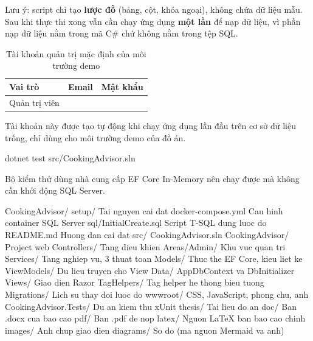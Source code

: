 Lưu ý: script chỉ tạo \textbf{lược đồ} (bảng, cột, khóa ngoại), không chứa dữ liệu
mẫu. Sau khi thực thi xong vẫn cần chạy ứng dụng \textbf{một lần} để
 nạp dữ liệu, vì phần nạp dữ liệu nằm trong mã C\# chứ không
nằm trong tệp SQL.


\begin{table}[H]
\centering
\caption{Tài khoản quản trị mặc định của môi trường demo}
\label{tab:tai-khoan}
\begin{tabularx}{\textwidth}{|P{3.4cm}|Y|Y|}
\hline
\bfseries Vai trò & \bfseries Email & \bfseries Mật khẩu \\ \hline
Quản trị viên &  &  \\ \hline
\end{tabularx}
\end{table}

Tài khoản này được tạo tự động khi chạy ứng dụng lần đầu trên cơ sở dữ liệu
trống, chỉ dùng cho môi trường demo của đồ án.


\begin{codeblock}
dotnet test src/CookingAdvisor.sln
\end{codeblock}

Bộ kiểm thử dùng nhà cung cấp EF Core In-Memory nên chạy được mà không cần khởi
động SQL Server.


\begin{codeblock}
CookingAdvisor/
  setup/                       Tai nguyen cai dat
    docker-compose.yml         Cau hinh container SQL Server
    sql/InitialCreate.sql      Script T-SQL dung luoc do
    README.md                  Huong dan cai dat
  src/
    CookingAdvisor.sln
    CookingAdvisor/            Project web
      Controllers/             Tang dieu khien
      Areas/Admin/             Khu vuc quan tri
      Services/                Tang nghiep vu, 3 thuat toan
      Models/                  Thuc the EF Core, kieu liet ke
      ViewModels/              Du lieu truyen cho View
      Data/                    AppDbContext va DbInitializer
      Views/                   Giao dien Razor
      TagHelpers/              Tag helper he thong bieu tuong
      Migrations/              Lich su thay doi luoc do
      wwwroot/                 CSS, JavaScript, phong chu, anh
    CookingAdvisor.Tests/      Du an kiem thu xUnit
  thesis/                      Tai lieu do an
    doc/                       Ban .docx cua bao cao
    pdf/                       Ban .pdf de nop
    latex/                     Nguon LaTeX ban bao cao chinh
    images/                    Anh chup giao dien
    diagrams/                  So do (ma nguon Mermaid va anh)
\end{codeblock}

